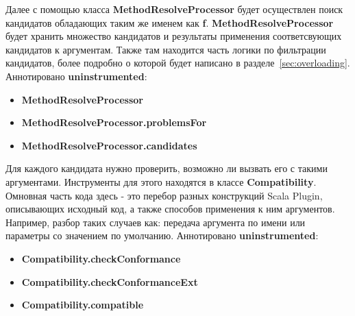 Далее с помощью класса \textbf{MethodResolveProcessor} будет осуществлен
поиск кандидатов обладающих таким же именем как \textbf{f}.
\textbf{MethodResolveProcessor} будет хранить множество кандидатов и
результаты применения соответсвующих кандидатов к аргументам.
Также там находится часть логики по фильтрации кандидатов, более подробно о которой
будет написано в разделе~\ref{sec:overloading}.
Аннотировано \textbf{uninstrumented}:
\begin{itemize}
  \item \textbf{MethodResolveProcessor}
  \item \textbf{MethodResolveProcessor.problemsFor}
  \item \textbf{MethodResolveProcessor.candidates}
\end{itemize}

Для каждого кандидата нужно проверить, возможно ли вызвать его с такими аргументами.
Инструменты для этого находятся в классе \textbf{Compatibility}.
Омновная часть кода здесь - это перебор разных конструкций Scala Plugin,
описывающих исходный код, а также способов применения к ним аргументов.
Например, разбор таких случаев как: передача аргумента по имени или параметры со
значением по умолчанию.
Аннотировано \textbf{uninstrumented}:
\begin{itemize}
  \item \textbf{Compatibility.checkConformance}
  \item \textbf{Compatibility.checkConformanceExt}
  \item \textbf{Compatibility.compatible}
\end{itemize}

